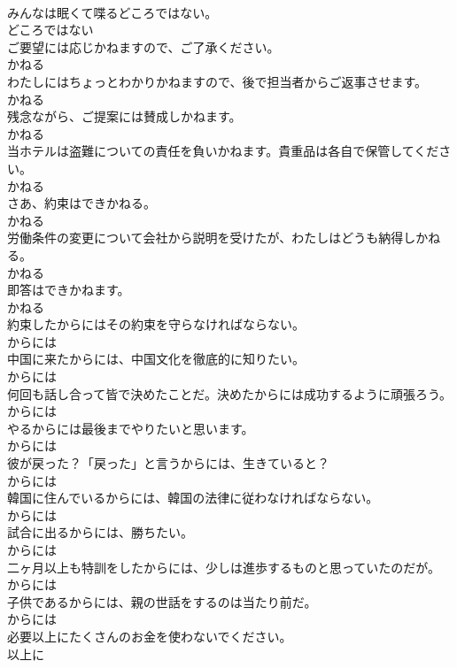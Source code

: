 \documentclass[8pt]{extreport}
\begin{document}
\begin{CJK}{UTF8}{min}
\\	みんなは眠くて喋るどころではない。	
\\	どころではない
\\	ご要望には応じかねますので、ご了承ください。	
\\	かねる
\\	わたしにはちょっとわかりかねますので、後で担当者からご返事させます。	
\\	かねる
\\	残念ながら、ご提案には賛成しかねます。	
\\	かねる
\\	当ホテルは盗難についての責任を負いかねます。貴重品は各自で保管してください。	
\\	かねる
\\	さあ、約束はできかねる。	
\\	かねる
\\	労働条件の変更について会社から説明を受けたが、わたしはどうも納得しかねる。	
\\	かねる
\\	即答はできかねます。	
\\	かねる
\\	約束したからにはその約束を守らなければならない。	
\\	からには
\\	中国に来たからには、中国文化を徹底的に知りたい。	
\\	からには
\\	何回も話し合って皆で決めたことだ。決めたからには成功するように頑張ろう。	
\\	からには
\\	やるからには最後までやりたいと思います。	
\\	からには
\\	彼が戻った？「戻った」と言うからには、生きていると？	
\\	からには
\\	韓国に住んでいるからには、韓国の法律に従わなければならない。	
\\	からには
\\	試合に出るからには、勝ちたい。	
\\	からには
\\	二ヶ月以上も特訓をしたからには、少しは進歩するものと思っていたのだが。	
\\	からには
\\	子供であるからには、親の世話をするのは当たり前だ。	
\\	からには
\\	必要以上にたくさんのお金を使わないでください。	
\\	以上に

\end{CJK}
\end{document}
